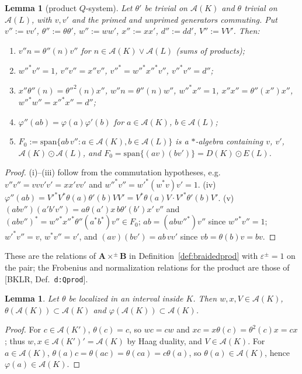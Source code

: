 \documentclass[11pt]{article}
\newtheorem{lemma}[theorem]{Lemma}
\theoremstyle{definition}
\theoremstyle{remark}
\newcommand{\cA}{\mathcal A}
\newcommand{\ph}{\varphi}
\newcommand{\bfB}{\mathbf B}
\newcommand{\bfA}{\mathbf A}
\begin{document}
\begin{lemma}[product $Q$-system]\label{lem:prod}
Let $\theta'$ be trivial on $\cA(K)$ and $\theta$ trivial on $\cA(L)$, with $v,v'$ and the primed and unprimed generators commuting. Put $v'':=vv'$, $\theta'':=\theta\theta'$, $w'':=ww'$, $x'':=xx'$, $d'':=dd'$, $V'':=VV'$. Then:
\begin{enumerate}[label=(\roman*),nosep]
\item $v''n=\theta''(n)v''$ for $n\in\cA(K)\vee\cA(L)$ (sums of products);
\item $w''^*v''=1$, $v''v''=x''v''$, $v''^*=w''^*x''^*v''$, $v''^*v''=d''$;
\item $x''\theta''(n)=\theta''^2(n)x''$, $w''n=\theta''(n)w''$, $w''^*x''=1$, $x''x''=\theta''(x'')x''$, $w''^*w''=x''^*x''=d''$;
\item $\ph''(ab)=\ph(a)\ph'(b)$ for $a\in\cA(K)$, $b\in\cA(L)$;
\item $F_0:=\mathrm{span}\{ab\,v'':a\in\cA(K),b\in\cA(L)\}$ is a $*$-algebra containing $v$, $v'$, $\cA(K)\odot\cA(L)$, and $F_0=\mathrm{span}\{(av)(bv')\}=D(K)\odot E(L)$.
\end{enumerate}
\end{lemma}
\begin{proof}
(i)--(iii) follow from the commutation hypotheses, e.g.\ $v''v''=vvv'v'=xx'vv'$ and $w''^*v''=w'^*(w^*v)v'=1$. (iv) $\ph''(ab)=V'^*V^*\theta(a)\theta'(b)VV'=V^*\theta(a)V\cdot V'^*\theta'(b)V'$. (v) $(abv'')(a'b'v'')=a\theta(a')x\,b\theta'(b')x'\,v''$ and $(abv'')^*=w''^*x''^*\theta''(a^*b^*)v''\in F_0$; $ab=(abw''^*)v''$ since $w''^*v''=1$; $w'^*v''=v$, $w^*v''=v'$, and $(av)(bv')=ab\,vv'$ since $vb=\theta(b)v=bv$.
\end{proof}
These are the relations of $\bfA\times^\pm\bfB$ in Definition~\ref{def:braidedprod} with $\varepsilon^\pm=1$ on the pair; the Frobenius and normalization relations for the product are those of [BKLR, Def.~\texttt{d:Qprod}].

\begin{lemma}\label{lem:phiK}
Let $\theta$ be localized in an interval inside $K$. Then $w,x,V\in\cA(K)$, $\theta(\cA(K))\subset\cA(K)$ and $\ph(\cA(K))\subset\cA(K)$.
\end{lemma}
\begin{proof}
For $c\in\cA(K')$, $\theta(c)=c$, so $wc=cw$ and $xc=x\theta(c)=\theta^2(c)x=cx$; thus $w,x\in\cA(K')'=\cA(K)$ by Haag duality, and $V\in\cA(K)$. For $a\in\cA(K)$, $\theta(a)c=\theta(ac)=\theta(ca)=c\theta(a)$, so $\theta(a)\in\cA(K)$, hence $\ph(a)\in\cA(K)$.
\end{proof}
\end{document}
